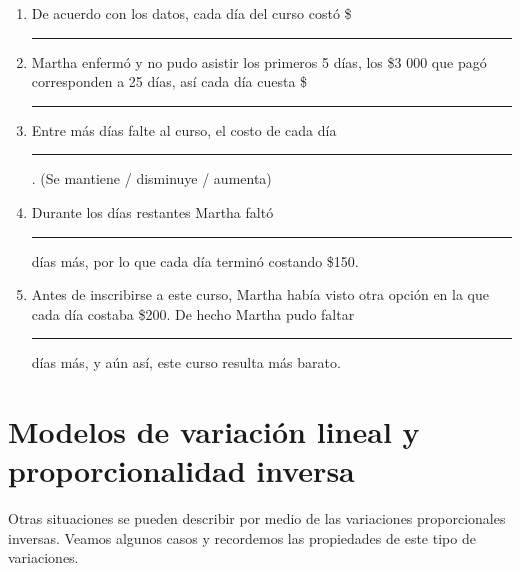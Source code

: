 \documentclass[11pt]{book}
\begin{document}
\begin{enumerate}
        \begin{enumerate}
          \item De acuerdo con los datos, cada día del curso costó \$\rule{2cm}{0.2pt}
          \item Martha enfermó y no pudo asistir los primeros 5 días, los \$3 000 que pagó corresponden a
                25 días, así cada día cuesta \$\rule{2cm}{0.2pt}
          \item Entre más días falte al curso, el costo de cada día \rule{2cm}{0.2pt}. (Se mantiene / disminuye / aumenta)
          \item Durante los días restantes Martha faltó \rule{2cm}{0.2pt} días más, por lo que cada día terminó costando \$150.
          \item Antes de inscribirse a este curso, Martha había visto otra opción en la que cada día costaba \$200.
                De hecho Martha pudo faltar \rule{2cm}{0.2pt} días más, y aún así, este curso resulta más barato.
        \end{enumerate}
\end{enumerate}

\newpage
\section{Modelos de variación lineal y proporcionalidad inversa}
Otras situaciones se pueden describir por medio de las variaciones proporcionales inversas. Veamos algunos casos y recordemos las propiedades de este tipo de variaciones.
\end{document}
